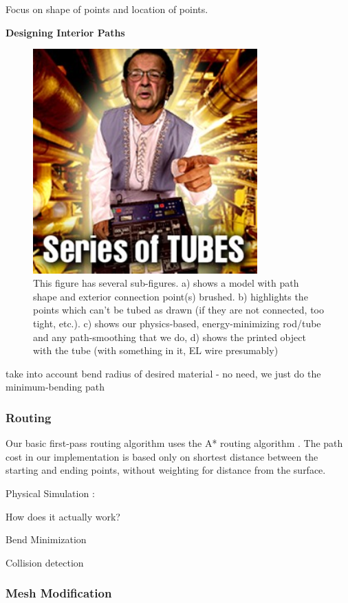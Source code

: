 Focus on shape of points and location of points.

\textbf{Designing Interior Paths}

\begin{figure}[h!]
\centering
    \includegraphics[width=3.4in]{figures/series-of-tubes.jpg}
\caption{This figure has several sub-figures.  a) shows a model with path shape and exterior connection point(s) brushed.  b) highlights the points which can't be tubed as drawn (if they are not connected, too tight, etc.).  c) shows our physics-based, energy-minimizing rod/tube and any path-smoothing that we do, d) shows the printed object with the tube (with something in it, EL wire presumably)}
\label{fig:tool-process-interior}
\end{figure}

take into account bend radius of desired material - no need, we just do the minimum-bending path

\subsubsection{Routing}

Our basic first-pass routing algorithm uses the A* routing algorithm \cite{Hart-Astar}.  The path cost in our implementation is based only on shortest distance between the starting and ending points, without weighting for distance from the surface.

Physical Simulation : 

How does it actually work?

Bend Minimization

Collision detection

\subsubsection{Mesh Modification}

